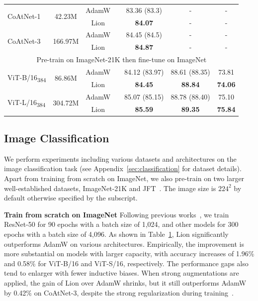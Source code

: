 \documentclass{article}
\newcommand{\cmark}{\ding{51}}
\newcommand{\xmark}{\ding{55}}
\newcommand{\name}{Lion}
\begin{document}
\begin{table}
{\begin{tabular}{lcccccc}
    \multirow{2}{*}{CoAtNet-1} & \multirow{2}{*}{42.23M} & AdamW & \multirow{2}{*}{\cmark} & 83.36 (83.3) & - & - \\
    & & \name & & \textbf{84.07} & - & - \\ \midrule
    \multirow{2}{*}{CoAtNet-3} & \multirow{2}{*}{166.97M} & AdamW & \multirow{2}{*}{\cmark} & 84.45 (84.5) & - & - \\
    & & \name & & \textbf{84.87} & - & - \\ \midrule
    \multicolumn{7}{c}{Pre-train on ImageNet-21K then fine-tune on ImageNet} \\ \midrule
    \multirow{2}{*}{ViT-B/16\textsubscript{384}} & \multirow{2}{*}{86.86M} & AdamW & \multirow{2}{*}{\xmark} & 84.12 (83.97) & 88.61 (88.35) & 73.81 \\
    & & \name & & \textbf{84.45} & \textbf{88.84} & \textbf{74.06} \\ \midrule
    \multirow{2}{*}{ViT-L/16\textsubscript{384}} & \multirow{2}{*}{304.72M} & AdamW & \multirow{2}{*}{\xmark} & 85.07 (85.15) & 88.78 (88.40) & 75.10 \\
    & & \name & & \textbf{85.59} & \textbf{89.35} & \textbf{75.84} \\
    \bottomrule
    \end{tabular}}
    \label{tab:imagenet}
    \vspace{-10pt}
\end{table}


\subsection{Image Classification}
We perform experiments including various datasets and architectures on the image classification task (see Appendix~\ref{sec:classification} for dataset details).
Apart from training from scratch on ImageNet, we also pre-train on two larger well-established datasets, ImageNet-21K and JFT~\citep{sun2017jft}.
The image size is $224^2$ by default otherwise specified by the subscript.



\textbf{Train from scratch on ImageNet}
Following previous works~\citep{dosovitskiy2021vit, he2016resnet}, 
we train ResNet-50 for 90 epochs with a batch size of 1,024, and other models for 300 epochs with a batch size of 4,096. As shown in Table~\ref{tab:imagenet}, \name{} significantly outperforms AdamW on various architectures. Empirically, the improvement is more substantial on models with larger capacity, with accuracy increases of 1.96\% and 0.58\% for ViT-B/16 and ViT-S/16, respectively.
The performance gaps also tend to enlarger with fewer inductive biases.
When strong augmentations are applied, the gain of \name{} over AdamW shrinks, but it still outperforms AdamW by 0.42\% on CoAtNet-3, despite the strong regularization during training~\citep{dai2021coatnet}.
\end{document}

